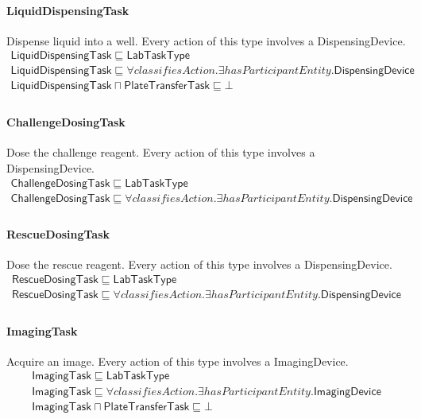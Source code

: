 \documentclass[10pt]{article}
\begin{document}
\paragraph{LiquidDispensingTask} Dispense liquid into a well. Every action of this type involves a DispensingDevice.
\[\begin{array}{l}
\mathsf{LiquidDispensingTask} \sqsubseteq  \mathsf{LabTaskType} \\
\mathsf{LiquidDispensingTask} \sqsubseteq  \forall \mathit{classifiesAction}.\exists \mathit{hasParticipantEntity}.\mathsf{DispensingDevice} \\
\mathsf{LiquidDispensingTask} \sqcap  \mathsf{PlateTransferTask} \sqsubseteq  \bot  \\
\end{array}\]
\paragraph{ChallengeDosingTask} Dose the challenge reagent. Every action of this type involves a DispensingDevice.
\[\begin{array}{l}
\mathsf{ChallengeDosingTask} \sqsubseteq  \mathsf{LabTaskType} \\
\mathsf{ChallengeDosingTask} \sqsubseteq  \forall \mathit{classifiesAction}.\exists \mathit{hasParticipantEntity}.\mathsf{DispensingDevice} \\
\end{array}\]
\paragraph{RescueDosingTask} Dose the rescue reagent. Every action of this type involves a DispensingDevice.
\[\begin{array}{l}
\mathsf{RescueDosingTask} \sqsubseteq  \mathsf{LabTaskType} \\
\mathsf{RescueDosingTask} \sqsubseteq  \forall \mathit{classifiesAction}.\exists \mathit{hasParticipantEntity}.\mathsf{DispensingDevice} \\
\end{array}\]
\paragraph{ImagingTask} Acquire an image. Every action of this type involves a ImagingDevice.
\[\begin{array}{l}
\mathsf{ImagingTask} \sqsubseteq  \mathsf{LabTaskType} \\
\mathsf{ImagingTask} \sqsubseteq  \forall \mathit{classifiesAction}.\exists \mathit{hasParticipantEntity}.\mathsf{ImagingDevice} \\
\mathsf{ImagingTask} \sqcap  \mathsf{PlateTransferTask} \sqsubseteq  \bot  \\
\end{array}\]
\end{document}
